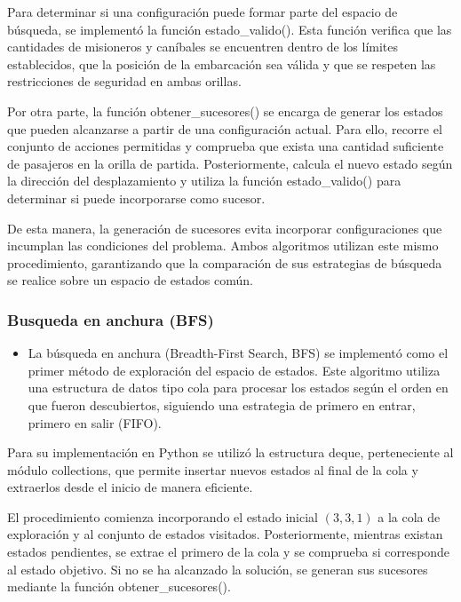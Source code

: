 \documentclass[
  spanish,
]{llncs}
\providecommand{\tightlist}{%
  \setlength{\itemsep}{0pt}\setlength{\parskip}{0pt}}
\begin{document}
Para determinar si una configuración puede formar parte del espacio de
búsqueda, se implementó la función estado\_valido(). Esta función
verifica que las cantidades de misioneros y caníbales se encuentren
dentro de los límites establecidos, que la posición de la embarcación
sea válida y que se respeten las restricciones de seguridad en ambas
orillas.

Por otra parte, la función obtener\_sucesores() se encarga de generar
los estados que pueden alcanzarse a partir de una configuración actual.
Para ello, recorre el conjunto de acciones permitidas y comprueba que
exista una cantidad suficiente de pasajeros en la orilla de partida.
Posteriormente, calcula el nuevo estado según la dirección del
desplazamiento y utiliza la función estado\_valido() para determinar si
puede incorporarse como sucesor.

De esta manera, la generación de sucesores evita incorporar
configuraciones que incumplan las condiciones del problema. Ambos
algoritmos utilizan este mismo procedimiento, garantizando que la
comparación de sus estrategias de búsqueda se realice sobre un espacio
de estados común.

\subsubsection{Busqueda en anchura (BFS)}\label{busqueda-en-anchura-bfs}

\begin{itemize}
\tightlist
\item
  La búsqueda en anchura (Breadth-First Search, BFS) se implementó como
  el primer método de exploración del espacio de estados. Este algoritmo
  utiliza una estructura de datos tipo cola para procesar los estados
  según el orden en que fueron descubiertos, siguiendo una estrategia de
  primero en entrar, primero en salir (FIFO).
\end{itemize}

Para su implementación en Python se utilizó la estructura deque,
perteneciente al módulo collections, que permite insertar nuevos estados
al final de la cola y extraerlos desde el inicio de manera eficiente.

El procedimiento comienza incorporando el estado inicial \((3,3,1)\) a
la cola de exploración y al conjunto de estados visitados.
Posteriormente, mientras existan estados pendientes, se extrae el
primero de la cola y se comprueba si corresponde al estado objetivo. Si
no se ha alcanzado la solución, se generan sus sucesores mediante la
función obtener\_sucesores().
\end{document}
